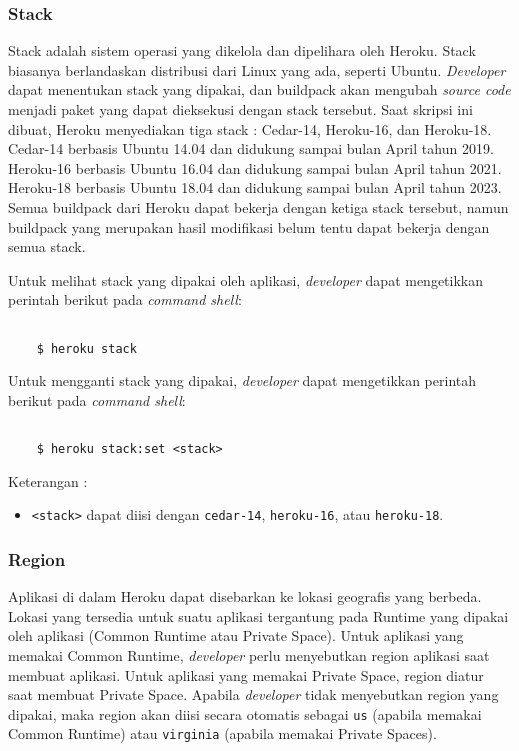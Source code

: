\subsubsection{Stack}
Stack adalah sistem operasi yang dikelola dan dipelihara oleh Heroku. Stack biasanya berlandaskan distribusi dari Linux yang ada, seperti Ubuntu. \textit{Developer} dapat menentukan stack yang dipakai, dan buildpack akan mengubah \textit{source code} menjadi paket yang dapat dieksekusi dengan stack tersebut. Saat skripsi ini dibuat, Heroku menyediakan tiga stack : Cedar-14, Heroku-16, dan Heroku-18. Cedar-14 berbasis Ubuntu 14.04 dan didukung sampai bulan April tahun 2019. Heroku-16 berbasis Ubuntu 16.04 dan didukung sampai bulan April tahun 2021. Heroku-18 berbasis Ubuntu 18.04 dan didukung sampai bulan April tahun 2023. Semua buildpack dari Heroku dapat bekerja dengan ketiga stack tersebut, namun buildpack yang merupakan hasil modifikasi belum tentu dapat bekerja dengan semua stack.

Untuk melihat stack yang dipakai oleh aplikasi, \textit{developer} dapat mengetikkan perintah berikut pada \textit{command shell}:
\begin{lstlisting}

	$ heroku stack

\end{lstlisting}

Untuk mengganti stack yang dipakai, \textit{developer} dapat mengetikkan perintah berikut pada \textit{command shell}:
\begin{lstlisting}

	$ heroku stack:set <stack>

\end{lstlisting}
Keterangan :
\begin{itemize}
\item \texttt{<stack>} dapat diisi dengan \texttt{cedar-14}, \texttt{heroku-16}, atau \texttt{heroku-18}.
\end{itemize}

\subsubsection{Region}
Aplikasi di dalam Heroku dapat disebarkan ke lokasi geografis yang berbeda. Lokasi yang tersedia untuk suatu aplikasi tergantung pada Runtime yang dipakai oleh aplikasi (Common Runtime atau Private Space). Untuk aplikasi yang memakai Common Runtime, \textit{developer} perlu menyebutkan region aplikasi saat membuat aplikasi. Untuk aplikasi yang memakai Private Space, region diatur saat membuat Private Space. Apabila \textit{developer} tidak menyebutkan region yang dipakai, maka region akan diisi secara otomatis sebagai \texttt{us} (apabila memakai Common Runtime) atau \texttt{virginia} (apabila memakai Private Spaces).

